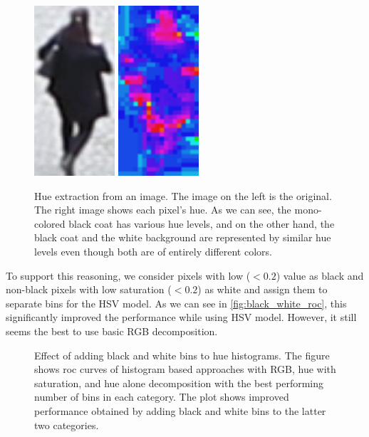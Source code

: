 \begin{figure}
    \centering
    \includegraphics[width=3cm]{img/bad_hue_orig.png}
    \includegraphics[width=3cm]{img/bad_hue_hue.png}
    \caption[Hue extraction from an image]{Hue extraction from an image. The image on the left is the original. The right image shows each pixel's hue. As we can see, the mono-colored black coat has various hue levels, and on the other hand, the black coat and the white background are represented by similar hue levels even though both are of entirely different colors.}
    \label{fig:bad_hue}
\end{figure}

To support this reasoning, we consider pixels with low ($< 0.2$)
value as black and non-black pixels with low saturation ($< 0.2$) as white and
assign them to separate bins for the HSV model. As we can see in \autoref{fig:black_white_roc}, this
significantly improved the performance while using HSV model. However, it still seems the best to use basic RGB decomposition.

\begin{figure}
    \def\svgwidth{0.9\columnwidth}
    
    \caption[Effect of adding black and white bins to the hue histograms]{Effect of adding black and white bins to hue histograms. The figure shows \gls{roc} curves of histogram based approaches with RGB, hue with saturation, and hue alone decomposition with the best performing number of bins in each category. The plot shows improved performance obtained by adding black and white bins to the latter two categories.}
    \label{fig:black_white_roc}
\end{figure}

